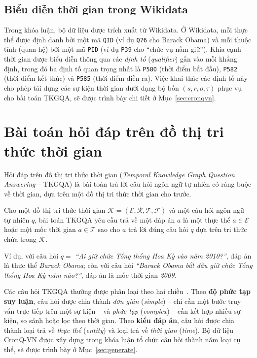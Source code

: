 \subsection{Biểu diễn thời gian trong Wikidata}

Trong khóa luận, bộ dữ liệu được trích xuất từ Wikidata. Ở Wikidata, mỗi thực thể được định danh
bởi một mã \texttt{QID} (ví dụ \texttt{Q76} cho Barack Obama) và mỗi thuộc tính (quan hệ) bởi một
mã \texttt{PID} (ví dụ \texttt{P39} cho ``chức vụ nắm giữ''). Khía cạnh thời gian được biểu diễn
thông qua các \textit{định tố} (\textit{qualifier}) gắn vào mỗi khẳng định, trong đó ba định tố
quan trọng nhất là \texttt{P580} (thời điểm bắt đầu), \texttt{P582} (thời điểm kết thúc) và
\texttt{P585} (thời điểm diễn ra). Việc khai thác các định tố này cho phép tái dựng các sự kiện
thời gian dưới dạng bộ bốn $(s, r, o, \tau)$ phục vụ cho bài toán TKGQA, sẽ được trình bày chi
tiết ở Mục~\ref{sec:cronqvn}.

\section{Bài toán hỏi đáp trên đồ thị tri thức thời gian}
\label{sec:tkgqa-def}

Hỏi đáp trên đồ thị tri thức thời gian (\textit{Temporal Knowledge Graph Question Answering} --
TKGQA) là bài toán trả lời câu hỏi ngôn ngữ tự nhiên có ràng buộc về thời gian, dựa trên một đồ
thị tri thức thời gian cho trước.

\begin{definition}
Cho một đồ thị tri thức thời gian $\mathcal{K} = (\mathcal{E}, \mathcal{R}, \mathcal{T},
\mathcal{F})$ và một câu hỏi ngôn ngữ tự nhiên $q$, bài toán TKGQA yêu cầu trả về một đáp án
$a$ là một thực thể $a \in \mathcal{E}$ hoặc một mốc thời gian $a \in \mathcal{T}$ sao cho $a$
trả lời đúng câu hỏi $q$ dựa trên tri thức chứa trong $\mathcal{K}$.
\end{definition}

Ví dụ, với câu hỏi $q = $ \textit{``Ai giữ chức Tổng thống Hoa Kỳ vào năm 2010?''}, đáp án là
thực thể \textit{Barack Obama}; còn với câu hỏi \textit{``Barack Obama bắt đầu giữ chức Tổng thống
Hoa Kỳ năm nào?''}, đáp án là mốc thời gian \textit{2009}.

Các câu hỏi TKGQA thường được phân loại theo hai chiều~\cite{saxena2021cronkgqa, chen2023multitq}.
Theo \textbf{độ phức tạp suy luận}, câu hỏi được chia thành \textit{đơn giản} (\textit{simple})
-- chỉ cần một bước truy vấn trực tiếp trên một sự kiện -- và \textit{phức tạp}
(\textit{complex}) -- cần kết hợp nhiều sự kiện, so sánh hoặc lọc theo thời gian. Theo
\textbf{kiểu đáp án}, câu hỏi được chia thành loại trả về \textit{thực thể} (\textit{entity}) và
loại trả về \textit{thời gian} (\textit{time}). Bộ dữ liệu CronQ-VN được xây dựng trong khóa luận
tổ chức câu hỏi thành năm loại cụ thể, sẽ được trình bày ở Mục~\ref{sec:generate}.

